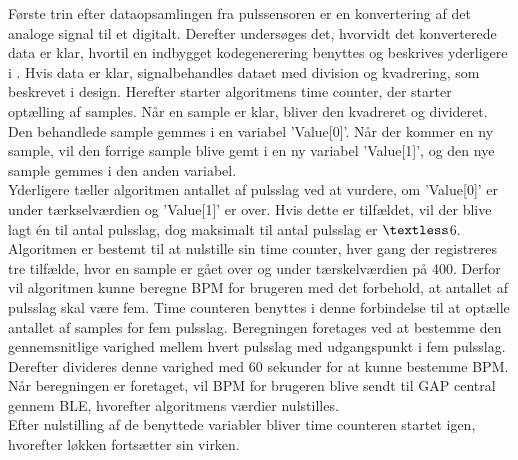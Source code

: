 Første trin efter dataopsamlingen fra pulssensoren er en konvertering af det analoge signal til et digitalt. Derefter undersøges det, hvorvidt det konverterede data er klar, hvortil en indbygget kodegenerering benyttes og beskrives yderligere i . Hvis data er klar, signalbehandles dataet med division og kvadrering, som beskrevet i design. Herefter starter algoritmens time counter, der starter optælling af samples. Når en sample er klar, bliver den kvadreret og divideret. Den behandlede sample gemmes i en variabel 'Value[0]'. Når der kommer en ny sample, vil den forrige sample blive gemt i en ny variabel 'Value[1]', og den nye sample gemmes i den anden variabel. \\
Yderligere tæller algoritmen antallet af pulsslag ved at vurdere, om 'Value[0]' er under tærkselværdien og 'Value[1]' er over. Hvis dette er tilfældet, vil der blive lagt én til antal pulsslag, dog maksimalt til antal pulsslag er $\textless$6. Algoritmen er bestemt til at nulstille sin time counter, hver gang der registreres tre tilfælde, hvor en sample er gået over og under tærskelværdien på 400. Derfor vil algoritmen kunne beregne BPM for brugeren med det forbehold, at antallet af pulsslag skal være fem. Time counteren benyttes i denne forbindelse til at optælle antallet af samples for fem pulsslag. Beregningen foretages ved at bestemme den gennemsnitlige varighed mellem hvert pulsslag med udgangspunkt i fem pulsslag. Derefter divideres denne varighed med 60 sekunder for at kunne bestemme BPM. Når beregningen er foretaget, vil BPM for brugeren blive sendt til GAP central gennem BLE, hvorefter algoritmens værdier nulstilles.\\
Efter nulstilling af de benyttede variabler bliver time counteren startet igen, hvorefter løkken fortsætter sin virken.

